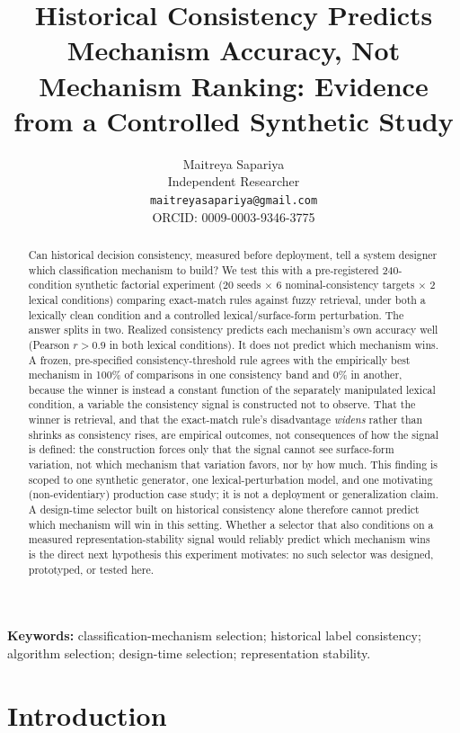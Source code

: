 \documentclass[11pt]{article}
\title{Historical Consistency Predicts Mechanism Accuracy, Not Mechanism
Ranking: Evidence from a Controlled Synthetic Study}
\author{Maitreya Sapariya \\ \small Independent Researcher \\ \small \texttt{maitreyasapariya@gmail.com} \\ \small ORCID: 0009-0003-9346-3775}
\date{}
\begin{document}
\maketitle

\begin{abstract}
Can historical decision consistency, measured before deployment, tell a
system designer which classification mechanism to build? We test this with a
pre-registered 240-condition synthetic factorial experiment (20 seeds $\times$ 6 nominal-consistency
targets $\times$ 2 lexical conditions) comparing exact-match rules against
fuzzy retrieval, under both a lexically clean condition and a controlled
lexical/surface-form perturbation. The answer splits in two.
Realized consistency predicts each mechanism's own accuracy well (Pearson
$r>0.9$ in both lexical conditions). It does not predict which mechanism
wins. A frozen, pre-specified consistency-threshold rule agrees with the
empirically best mechanism in 100\% of comparisons in one consistency band
and 0\% in another, because the winner is instead a constant function of the
separately manipulated lexical condition, a variable the consistency signal
is constructed not to observe.
That the winner is retrieval, and that the exact-match rule's disadvantage
\emph{widens} rather than shrinks as consistency rises, are empirical
outcomes, not consequences of how the signal is defined: the construction
forces only that the signal cannot see surface-form variation, not which
mechanism that variation favors, nor by how much.
This finding is scoped to one synthetic generator, one lexical-perturbation
model, and one motivating (non-evidentiary) production case study; it is not
a deployment or generalization claim. A design-time selector built on historical
consistency alone therefore cannot predict which mechanism will win in this
setting. Whether a selector that also conditions on a measured
representation-stability signal would reliably predict which mechanism wins
is the direct next hypothesis this experiment motivates: no such selector was
designed, prototyped, or tested here.
\end{abstract}

\noindent\textbf{Keywords:} classification-mechanism selection; historical
label consistency; algorithm selection; design-time selection;
representation stability.

\section{Introduction}
\label{sec:introduction}
\end{document}
